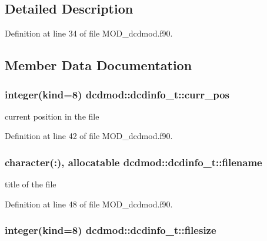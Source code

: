 \subsection{Detailed Description}


Definition at line 34 of file M\-O\-D\-\_\-dcdmod.\-f90.



\subsection{Member Data Documentation}
\hypertarget{structdcdmod_1_1dcdinfo__t_aea02e6390d9b31e54095730d994b249f}{
\subsubsection[{curr\-\_\-pos}]{\setlength{\rightskip}{0pt plus 5cm}integer(kind=8) dcdmod\-::dcdinfo\-\_\-t\-::curr\-\_\-pos}}\label{structdcdmod_1_1dcdinfo__t_aea02e6390d9b31e54095730d994b249f}


current position in the file 



Definition at line 42 of file M\-O\-D\-\_\-dcdmod.\-f90.

\hypertarget{structdcdmod_1_1dcdinfo__t_a2fc640f68774b801c8390ee12830a410}{
\subsubsection[{filename}]{\setlength{\rightskip}{0pt plus 5cm}character(\-:), allocatable dcdmod\-::dcdinfo\-\_\-t\-::filename}}\label{structdcdmod_1_1dcdinfo__t_a2fc640f68774b801c8390ee12830a410}


title of the file 



Definition at line 48 of file M\-O\-D\-\_\-dcdmod.\-f90.

\hypertarget{structdcdmod_1_1dcdinfo__t_a46621c35e11573a47ddc4e9633192322}{
\subsubsection[{filesize}]{\setlength{\rightskip}{0pt plus 5cm}integer(kind=8) dcdmod\-::dcdinfo\-\_\-t\-::filesize}}\label{structdcdmod_1_1dcdinfo__t_a46621c35e11573a47ddc4e9633192322}


